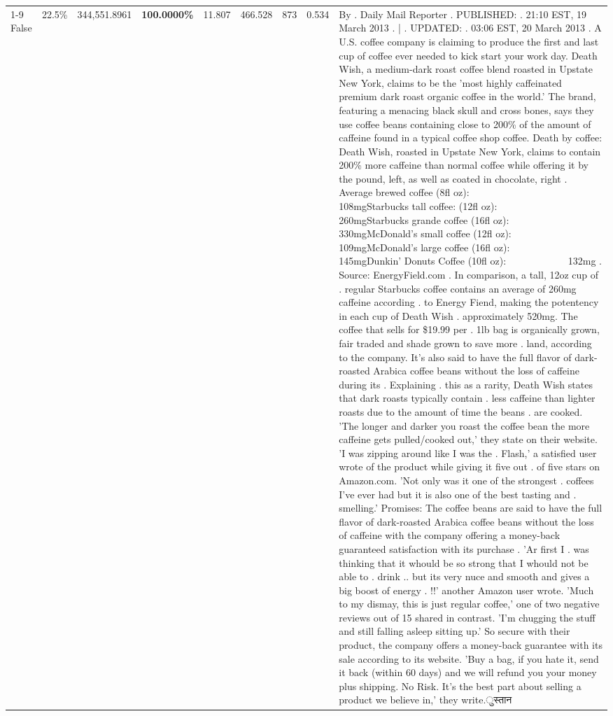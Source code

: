 \begin{table}[H]
{\begin{tabular}{lllrlllll}
\cline{1-9}
False & 22.5\% & 344,551.8961 & \bfseries \color{red} 100.0000\% & 11.807 & 466.528 & 873 & 0.534 & By . Daily Mail Reporter . PUBLISHED: . 21:10 EST, 19 March 2013 . | . UPDATED: . 03:06 EST, 20 March 2013 . A U.S. coffee company is claiming to produce the first and last cup of coffee ever needed to kick start your work day. Death Wish, a medium-dark roast coffee blend roasted in Upstate New York, claims to be the 'most highly caffeinated premium dark roast organic coffee in the world.' The brand, featuring a menacing black skull and cross bones, says they use coffee beans containing close to 200\% of the amount of caffeine found in a typical coffee shop coffee. Death by coffee: Death Wish, roasted in Upstate New York, claims to contain 200\% more caffeine than normal coffee while offering it by the pound, left, as well as coated in chocolate, right . Average brewed coffee (8fl oz):              108mgStarbucks tall coffee: (12fl oz):                260mgStarbucks grande coffee (16fl oz):         330mgMcDonald's small coffee (12fl oz):           109mgMcDonald's large coffee (16fl oz):           145mgDunkin' Donuts Coffee (10fl oz):             132mg . Source: EnergyField.com . In comparison, a tall, 12oz cup of . regular Starbucks coffee contains an average of 260mg caffeine according . to Energy Fiend, making the potentency in each cup of Death Wish . approximately 520mg. The coffee that sells for \$19.99 per . 1lb bag is organically grown, fair traded and shade grown to save more . land, according to the company. It's also said to have the full flavor of dark-roasted Arabica coffee beans without the loss of caffeine during its . Explaining . this as a rarity, Death Wish states that dark roasts typically contain . less caffeine than lighter roasts due to the amount of time the beans . are cooked. 'The longer and darker you roast the coffee bean the more caffeine gets pulled/cooked out,' they state on their website. 'I was zipping around like I was the . Flash,' a satisfied user wrote of the product while giving it five out . of five stars on Amazon.com. 'Not only was it one of the strongest . coffees I've ever had but it is also one of the best tasting and . smelling.’ Promises: The coffee beans are said to have the full flavor of dark-roasted Arabica coffee beans without the loss of caffeine with the company offering a money-back guaranteed satisfaction with its purchase . 'Ar first I . was thinking that it whould be so strong that I whould not be able to . drink .. but its very nuce and smooth and gives a big boost of energy . !!' another Amazon user wrote. 'Much to my dismay, this is just regular coffee,' one of two negative reviews out of 15 shared in contrast. 'I'm chugging the stuff and still falling asleep sitting up.' So secure with their product, the company offers a money-back guarantee with its sale according to its website. 'Buy a bag, if you hate it, send it back (within 60 days) and we will refund you your money plus shipping. No Risk. It’s the best part about selling a product we believe in,' they write.ुस्तान \\

\end{tabular}}
\end{table}
